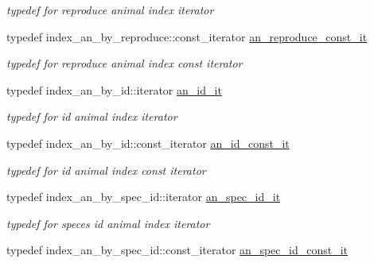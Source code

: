 \begin{DoxyCompactItemize}
\begin{DoxyCompactList}\small\item\em typedef for reproduce animal index iterator \end{DoxyCompactList}\item 
\hypertarget{classSubsystemContainer_ab227fa38862bc3645a12fa29b277c3c1}{
typedef index\_\-an\_\-by\_\-reproduce::const\_\-iterator \hyperlink{classSubsystemContainer_ab227fa38862bc3645a12fa29b277c3c1}{an\_\-reproduce\_\-const\_\-it}}
\label{classSubsystemContainer_ab227fa38862bc3645a12fa29b277c3c1}

\begin{DoxyCompactList}\small\item\em typedef for reproduce animal index const iterator \end{DoxyCompactList}\item 
\hypertarget{classSubsystemContainer_a016775688f9d4baed66e8bdc3fbc0ec9}{
typedef index\_\-an\_\-by\_\-id::iterator \hyperlink{classSubsystemContainer_a016775688f9d4baed66e8bdc3fbc0ec9}{an\_\-id\_\-it}}
\label{classSubsystemContainer_a016775688f9d4baed66e8bdc3fbc0ec9}

\begin{DoxyCompactList}\small\item\em typedef for id animal index iterator \end{DoxyCompactList}\item 
\hypertarget{classSubsystemContainer_a65c443ffed219d6e1d4c745bb98577e0}{
typedef index\_\-an\_\-by\_\-id::const\_\-iterator \hyperlink{classSubsystemContainer_a65c443ffed219d6e1d4c745bb98577e0}{an\_\-id\_\-const\_\-it}}
\label{classSubsystemContainer_a65c443ffed219d6e1d4c745bb98577e0}

\begin{DoxyCompactList}\small\item\em typedef for id animal index const iterator \end{DoxyCompactList}\item 
\hypertarget{classSubsystemContainer_a1126a7368a8724cd69ea707f6c90bd42}{
typedef index\_\-an\_\-by\_\-spec\_\-id::iterator \hyperlink{classSubsystemContainer_a1126a7368a8724cd69ea707f6c90bd42}{an\_\-spec\_\-id\_\-it}}
\label{classSubsystemContainer_a1126a7368a8724cd69ea707f6c90bd42}

\begin{DoxyCompactList}\small\item\em typedef for speces id animal index iterator \end{DoxyCompactList}\item 
\hypertarget{classSubsystemContainer_a7e66c6e5b6efcdaee148cbd72331ef34}{
typedef index\_\-an\_\-by\_\-spec\_\-id::const\_\-iterator \hyperlink{classSubsystemContainer_a7e66c6e5b6efcdaee148cbd72331ef34}{an\_\-spec\_\-id\_\-const\_\-it}}
\label{classSubsystemContainer_a7e66c6e5b6efcdaee148cbd72331ef34}


\end{DoxyCompactItemize}
